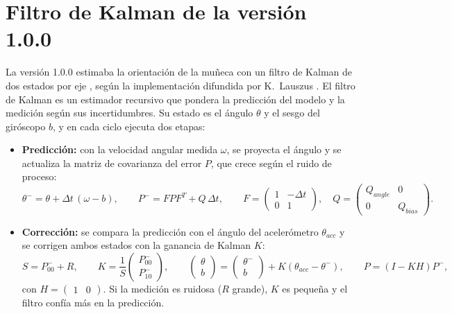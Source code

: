 \section{Filtro de Kalman de la versión 1.0.0}
\label{sec:kalman}

La versión 1.0.0 estimaba la orientación de la muñeca con un filtro de Kalman de dos estados por eje \cite{kalman1960}, según la implementación difundida por K.~Lauszus \cite{lauszus_kalman}. El filtro de Kalman es un estimador recursivo que pondera la predicción del modelo y la medición según sus incertidumbres. Su estado es el ángulo $\theta$ y el sesgo del giróscopo $b$, y en cada ciclo ejecuta dos etapas:

\begin{itemize}
    \item \textbf{Predicción:} con la velocidad angular medida $\omega$, se proyecta el ángulo y se actualiza la matriz de covarianza del error $P$, que crece según el ruido de proceso:
    \begin{equation}
    \theta^- = \theta + \Delta t\,(\omega - b), \qquad
    P^- = F P F^{T} + Q\,\Delta t, \qquad
    F = \begin{pmatrix} 1 & -\Delta t \\ 0 & 1 \end{pmatrix}, \quad
    Q = \begin{pmatrix} Q_{angle} & 0 \\ 0 & Q_{bias} \end{pmatrix}.
    \end{equation}
    \item \textbf{Corrección:} se compara la predicción con el ángulo del acelerómetro $\theta_{acc}$ y se corrigen ambos estados con la ganancia de Kalman $K$:
    \begin{equation}
    S = P^-_{00} + R, \qquad
    K = \frac{1}{S}\begin{pmatrix} P^-_{00} \\ P^-_{10} \end{pmatrix}, \qquad
    \begin{pmatrix} \theta \\ b \end{pmatrix} = \begin{pmatrix} \theta^- \\ b \end{pmatrix} + K\left(\theta_{acc} - \theta^-\right), \qquad
    P = \left(I - K H\right) P^-,
    \end{equation}
    con $H = \begin{pmatrix} 1 & 0 \end{pmatrix}$. Si la medición es ruidosa ($R$ grande), $K$ es pequeña y el filtro confía más en la predicción.
\end{itemize}

